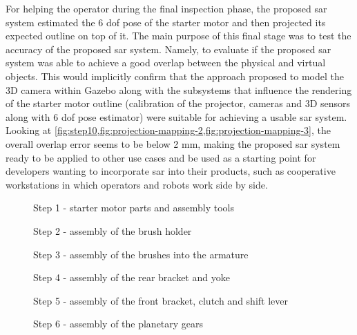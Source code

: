 For helping the operator during the final inspection phase, the proposed \gls{sar} system estimated the 6 \gls{dof} pose of the starter motor and then projected its expected outline on top of it. The main purpose of this final stage was to test the accuracy of the proposed \gls{sar} system. Namely, to evaluate if the proposed \gls{sar} system was able to achieve a good overlap between the physical and virtual objects. This would implicitly confirm that the approach proposed to model the 3D camera within Gazebo along with the subsystems that influence the rendering of the starter motor outline (calibration of the projector, cameras and 3D sensors along with 6 \gls{dof} pose estimator) were suitable for achieving a usable \gls{sar} system. Looking at \cref{fig:step10,fig:projection-mapping-2,fig:projection-mapping-3}, the overall overlap error seems to be below 2 mm, making the proposed \gls{sar} system ready to be applied to other use cases and be used as a starting point for developers wanting to incorporate \gls{sar} into their products, such as cooperative workstations in which operators and robots work side by side.

\begin{figure}[H]
	\begin{floatrow}[2]
		{\caption{Step 1 - starter motor parts and assembly tools}\label{fig:assembly-parts}}
		{\caption{Step 2 - assembly of the brush holder}\label{fig:step2}}
	\end{floatrow}
\end{figure}

\begin{figure}[H]
	\begin{floatrow}[2]
		{\caption{Step 3 - assembly of the brushes into the armature}\label{fig:step3}}
		{\caption{Step 4 - assembly of the rear bracket and yoke}\label{fig:step4}}
	\end{floatrow}
\end{figure}

\begin{figure}[H]
	\begin{floatrow}[2]
		{\caption{Step 5 - assembly of the front bracket, clutch and shift lever}\label{fig:step5}}
		{\caption{Step 6 - assembly of the planetary gears}\label{fig:step6}}
	\end{floatrow}
\end{figure}

